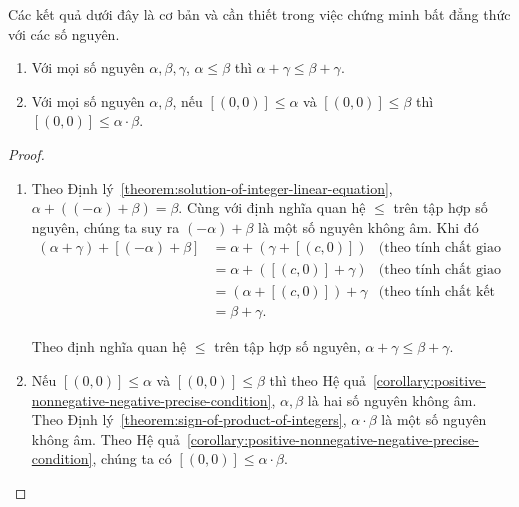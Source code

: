 Các kết quả dưới đây là cơ bản và cần thiết trong việc chứng minh bất đẳng thức với các số nguyên.
\begin{theorem}\label{theorem:integers-order-and-operations}
    \begin{enumerate}[label={(\roman*)}]
        \item Với mọi số nguyên $\alpha, \beta, \gamma$, $\alpha\leq \beta$ thì $\alpha + \gamma\leq \beta + \gamma$.
        \item Với mọi số nguyên $\alpha, \beta$, nếu $[(0,0)]\leq\alpha$ và $[(0,0)]\leq\beta$ thì $[(0,0)]\leq\alpha\cdot\beta$.
    \end{enumerate}
\end{theorem}

\begin{proof}
    \begin{enumerate}[label={(\roman*)}]
        \item Theo Định lý~\ref{theorem:solution-of-integer-linear-equation}, $\alpha + ((-\alpha) + \beta) = \beta$. Cùng với định nghĩa quan hệ $\leq$ trên tập hợp số nguyên, chúng ta suy ra $(-\alpha) + \beta$ là một số nguyên không âm. Khi đó
              \begin{align*}
                  (\alpha + \gamma) + [(-\alpha) + \beta] & = \alpha + (\gamma + [(c, 0)]) & \text{(theo tính chất giao hoán của phép cộng số nguyên)} \\
                                                          & = \alpha + ([(c, 0)] + \gamma) & \text{(theo tính chất giao hoán của phép cộng số nguyên)} \\
                                                          & = (\alpha + [(c, 0)]) + \gamma & \text{(theo tính chất kết hợp của phép cộng số nguyên)}   \\
                                                          & = \beta + \gamma.
              \end{align*}

              Theo định nghĩa quan hệ $\leq$ trên tập hợp số nguyên, $\alpha + \gamma\leq \beta + \gamma$.
        \item Nếu $[(0,0)]\leq\alpha$ và $[(0,0)]\leq\beta$ thì theo Hệ quả~\ref{corollary:positive-nonnegative-negative-precise-condition}, $\alpha, \beta$ là hai số nguyên không âm. Theo Định lý~\ref{theorem:sign-of-product-of-integers}, $\alpha\cdot\beta$ là một số nguyên không âm. Theo Hệ quả~\ref{corollary:positive-nonnegative-negative-precise-condition}, chúng ta có $[(0,0)]\leq \alpha\cdot\beta$.
    \end{enumerate}
\end{proof}

